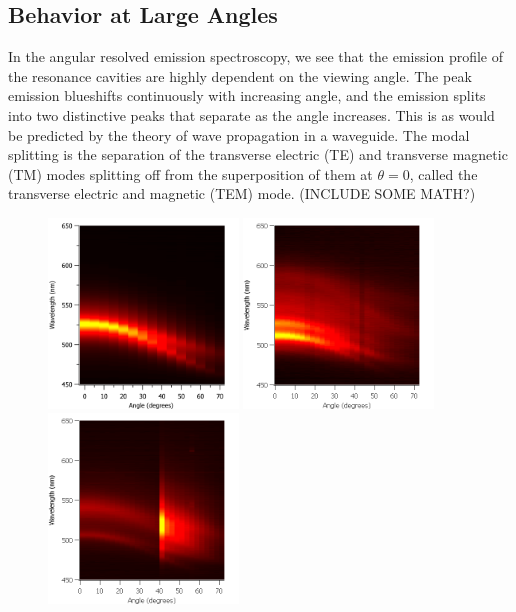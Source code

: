 \documentclass{report}
\begin{document}
        \subsection{Behavior at Large Angles}
		In the angular resolved emission spectroscopy, we see that the emission profile of the resonance cavities are highly dependent on the viewing angle. The peak emission blueshifts continuously with increasing angle, and the emission splits into two distinctive peaks that separate as the angle increases. This is as would be predicted by the theory of wave propagation in a waveguide. The modal splitting is the separation of the transverse electric (TE) and transverse magnetic (TM) modes splitting off from the superposition of them at $\theta=0$, called the transverse electric and magnetic (TEM) mode. (INCLUDE SOME MATH?)
		\begin{figure}
            \centering
            \includegraphics[width=0.45\textwidth]{images/n2_heatmap.png}
            \includegraphics[width=0.45\textwidth]{images/n3_heatmap.png}
            \newline
            \includegraphics[width=0.45\textwidth]{images/n4_heatmap.png}

\end{figure}
\end{document}
